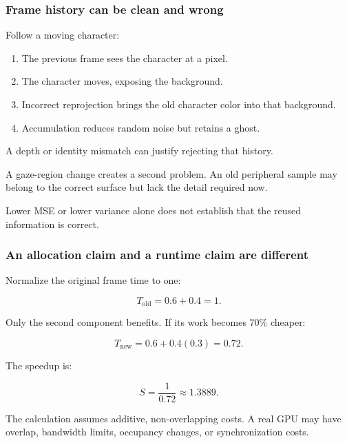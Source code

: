 \subsubsection{Frame history can be clean and wrong}\label{appendix-92ff77d4dfdc-frame-history-can-be-clean-and-wrong}

\hypertarget{appendix-92ff77d4dfdc-frame-history-can-be-clean-and-wrong}{}

Follow a moving character:

\begin{enumerate}
\def\labelenumi{\arabic{enumi}.}
\tightlist
\item
  The previous frame sees the character at a pixel.
\item
  The character moves, exposing the background.
\item
  Incorrect reprojection brings the old character color into that background.
\item
  Accumulation reduces random noise but retains a ghost.
\end{enumerate}

A depth or identity mismatch can justify rejecting that history.

A gaze-region change creates a second problem. An old peripheral sample may belong to the correct surface but lack the detail required now.

Lower MSE or lower variance alone does not establish that the reused information is correct.

\subsubsection{An allocation claim and a runtime claim are different}\label{appendix-92ff77d4dfdc-an-allocation-claim-and-a-runtime-claim-are-different}

\hypertarget{appendix-92ff77d4dfdc-an-allocation-claim-and-a-runtime-claim-are-different}{}

Normalize the original frame time to one:

\[
T_{\mathrm{old}}=0.6+0.4=1.
\]

Only the second component benefits. If its work becomes 70\% cheaper:

\[
T_{\mathrm{new}}=0.6+0.4(0.3)=0.72.
\]

The speedup is:

\[
S=\frac1{0.72}\approx1.3889.
\]

The calculation assumes additive, non-overlapping costs. A real GPU may have overlap, bandwidth limits, occupancy changes, or synchronization costs.

